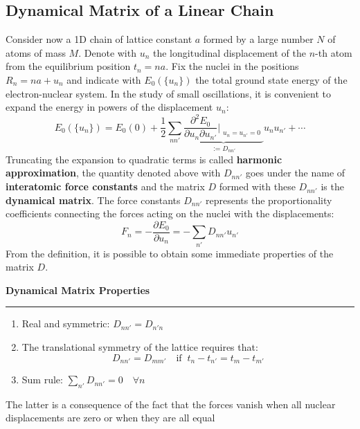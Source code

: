\documentclass[10.75pt,a4paper,openright,bottom=2cm]{article}
\begin{document}
\subsection{Dynamical Matrix of a Linear Chain}
Consider now a 1D chain of lattice constant $a$ formed by a large number $N$ of atoms of mass $M$. Denote with $u_n$ the longitudinal displacement of the $n$-th atom from the equilibrium position $t_n=na$. Fix the nuclei in the positions $R_n=na+u_n$ and indicate with $E_0(\{u_n\})$ the total ground state energy of the electron-nuclear system. In the study of small oscillations, it is convenient to expand the energy in powers of the displacement $u_n$:
\[
E_0(\{u_n\})=E_0(0)+\frac{1}{2}\sum_{nn'}\underbrace{\frac{\partial^2E_0}{\partial u_n\partial u_{n'}}\Bigr|_{\substack{u_n=u_{n'}=0}}}_{:=D_{nn'}}u_nu_{n'}+\cdots
\]
Truncating the expansion to quadratic terms is called \textbf{harmonic approximation}, the quantity denoted above with $D_{nn'}$ goes under the name of \textbf{interatomic force constants} and the matrix $D$ formed with these $D_{nn'}$ is the \textbf{dynamical matrix}. The force constants $D_{nn'}$ represents the proportionality coefficients connecting the forces acting on the nuclei with the displacements:
\[
F_n=-\frac{\partial E_0}{\partial u_n}=-\sum_{n'}D_{nn'}u_{n'}
\]
From the definition, it is possible to obtain some immediate properties of the matrix $D$.
\begin{mybox}
\textbf{Dynamical Matrix Properties}
\hrule
\begin{enumerate}\renewcommand{\labelenumi}{\arabic{enumi})}
    \item Real and symmetric: $D_{nn'}=D_{n'n}$
    \item The translational symmetry of the lattice requires that:
    \[
    D_{nn'}=D_{mm'} \quad \text{if}\;\; t_n-t_{n'}=t_m-t_{m'}
    \]
    \item Sum rule: $\sum_{n'}D_{nn'}=0 \quad \forall n$
\end{enumerate}
The latter is a consequence of the fact that the forces vanish when all nuclear displacements are zero or when they are all equal
\end{mybox}
\end{document}
